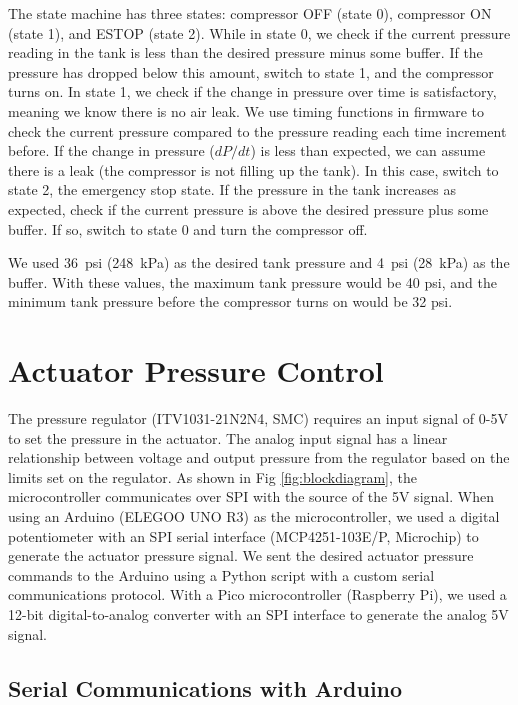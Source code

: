 The state machine has three states: compressor OFF (state 0), compressor ON (state 1), and ESTOP (state 2). While in state 0, we check if the current pressure reading in the tank is less than the desired pressure minus some buffer. If the pressure has dropped below this amount, switch to state 1, and the compressor turns on. In state 1, we check if the change in pressure over time is satisfactory, meaning we know there is no air leak. We use timing functions in firmware to check the current pressure compared to the pressure reading each time increment before. If the change in pressure ($dP/dt$) is less than expected, we can assume there is a leak (the compressor is not filling up the tank). In this case, switch to state 2, the emergency stop state. If the pressure in the tank increases as expected, check if the current pressure is above the desired pressure plus some buffer. If so, switch to state 0 and turn the compressor off. 

We used 36~psi (248~kPa) as the desired tank pressure and 4~psi (28~kPa) as the buffer. With these values, the maximum tank pressure would be 40 psi, and the minimum tank pressure before the compressor turns on would be 32 psi. 

\clearpage
\section{Actuator Pressure Control}

The pressure regulator (ITV1031-21N2N4, SMC) requires an input signal of 0-5V to set the pressure in the actuator. The analog input signal has a linear relationship between voltage and output pressure from the regulator based on the limits set on the regulator. As shown in Fig \ref{fig:blockdiagram}, the microcontroller communicates over SPI with the source of the 5V signal. When using an Arduino (ELEGOO UNO R3) as the microcontroller, we used a digital potentiometer with an SPI serial interface (MCP4251-103E/P, Microchip) to generate the actuator pressure signal. We sent the desired actuator pressure commands to the Arduino using a Python script with a custom serial communications protocol. With a Pico microcontroller (Raspberry Pi), we used a 12-bit digital-to-analog converter with an SPI interface to generate the analog 5V signal. 

\subsection{Serial Communications with Arduino}

